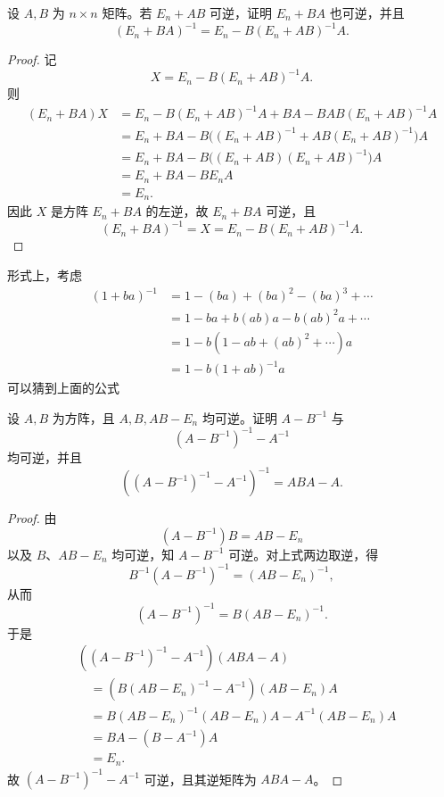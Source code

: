 \begin{problem}
设 $A,B$ 为 $n\times n$ 矩阵。若 $E_n+AB$ 可逆，证明 $E_n+BA$ 也可逆，并且
	\[
	(E_n+BA)^{-1}=E_n-B(E_n+AB)^{-1}A.
	\]
\end{problem}

\begin{proof}
	记
	\[
	X=E_n-B(E_n+AB)^{-1}A.
	\]
	则
	\[
	\begin{aligned}
		(E_n+BA)X
		&=E_n-B(E_n+AB)^{-1}A+BA
		-BAB(E_n+AB)^{-1}A\\
		&=E_n+BA
		-B\bigl((E_n+AB)^{-1}+AB(E_n+AB)^{-1}\bigr)A\\
		&=E_n+BA
		-B\bigl((E_n+AB)(E_n+AB)^{-1}\bigr)A\\
		&=E_n+BA-BE_nA\\
		&=E_n.
	\end{aligned}
	\]
	因此 $X$ 是方阵 $E_n+BA$ 的左逆，故 $E_n+BA$ 可逆，且
	\[
	(E_n+BA)^{-1}=X
	=E_n-B(E_n+AB)^{-1}A.
	\]
\end{proof}


形式上，考虑
\[\begin{aligned}
	(1+ba)^{-1}&=1-(ba)+(ba)^2-(ba)^3+\cdots\\
	&=1-ba+b(ab)a-b(ab)^2a+\cdots\\
	&=1-b(1-ab+(ab)^2+\cdots)a\\
	&=1-b(1+ab)^{-1}a
\end{aligned}  \]
可以猜到上面的公式

\begin{problem}
设 $A,B$ 为方阵，且 $A,B,AB-E_n$ 均可逆。证明 $A-B^{-1}$ 与
	\[
	(A-B^{-1})^{-1}-A^{-1}
	\]
	均可逆，并且
	\[
	\left((A-B^{-1})^{-1}-A^{-1}\right)^{-1}=ABA-A.
	\]
\end{problem}

\begin{proof}
	由
	\[
	(A-B^{-1})B=AB-E_n
	\]
	以及 $B$、$AB-E_n$ 均可逆，知 $A-B^{-1}$ 可逆。对上式两边取逆，得
	\[
	B^{-1}(A-B^{-1})^{-1}=(AB-E_n)^{-1},
	\]
	从而
	\[
	(A-B^{-1})^{-1}=B(AB-E_n)^{-1}.
	\]
	于是
	\[
	\begin{aligned}
		&\left((A-B^{-1})^{-1}-A^{-1}\right)(ABA-A)\\
		&\quad=\left(B(AB-E_n)^{-1}-A^{-1}\right)(AB-E_n)A\\
		&\quad=B(AB-E_n)^{-1}(AB-E_n)A
		-A^{-1}(AB-E_n)A\\
		&\quad=BA-(B-A^{-1})A\\
		&\quad=E_n.
	\end{aligned}
	\]
	故 $(A-B^{-1})^{-1}-A^{-1}$ 可逆，且其逆矩阵为 $ABA-A$。
\end{proof}

